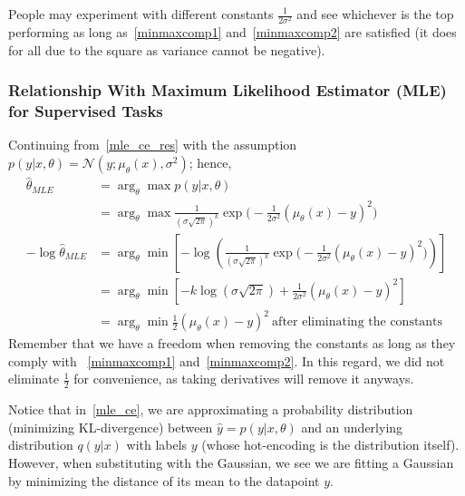 \documentclass{book}
\numberwithin{equation}{subsection}
\begin{document}
People may experiment with different constants $\frac{1}{2\sigma^2}$ and see whichever is the top performing as long as~\ref{minmaxcomp1} and~\ref{minmaxcomp2} are satisfied (it does for all due to the square as variance cannot be negative).
\subsubsection{Relationship With Maximum Likelihood Estimator (MLE) for Supervised Tasks}
\label{mle_mse}
Continuing from~\ref{mle_ce_res} with the assumption $p(y|x,\theta) = \mathcal{N}(y; \mu_\theta(x),\sigma^2)$; hence, 
\begin{align}
    \hat{\theta}_{MLE} 
    &= \arg_\theta \max p(y|x,\theta)\\
    &= \arg_\theta \max \frac{1}{(\sigma\sqrt{2\pi})^k}\exp\Big(-\frac{1}{2\sigma^2}(\mu_\theta(x)-y)^2\Big)\\
    -\log\hat{\theta}_{MLE} &= \arg_\theta\min\left[-\log\left(\frac{1}{(\sigma\sqrt{2\pi})^k}\exp\Big(-\frac{1}{2\sigma^2}(\mu_\theta(x)-y)^2\Big)\right)\right]\\
    &= \arg_\theta\min[-k\log(\sigma\sqrt{2\pi}) + \frac{1}{2\sigma^2}(\mu_\theta(x)-y)^2]\\
    &= \arg_\theta \min\frac{1}{2}(\mu_\theta(x)-y)^2\ \text{after eliminating the constants}
    \label{mse_derivation_res1}
\end{align}
Remember that we have a freedom when removing the constants as long as they comply with ~\ref{minmaxcomp1} and~\ref{minmaxcomp2}. In this regard, we did not eliminate $\frac{1}{2}$ for convenience, as taking derivatives will remove it anyways. 

Notice that in~\ref{mle_ce}, we are approximating a probability distribution (minimizing KL-divergence) between $\hat{y} = p(y|x,\theta)$ and an underlying distribution $q(y|x)$ with labels $y$ (whose hot-encoding is the distribution itself). However, when substituting with the Gaussian, we see we are fitting a Gaussian by minimizing the distance of its mean to the datapoint $y$.  
\end{document}
